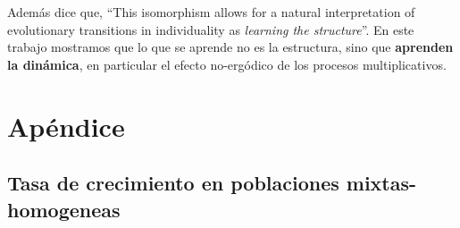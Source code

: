 \documentclass[a4paper,10pt]{article}
\begin{document}
Además \cite{czegel2019-bayesianEvolution} dice que, ``This isomorphism allows for a natural interpretation of evolutionary transitions in individuality as \emph{learning the structure}''.
En este trabajo mostramos que lo que se aprende no es la estructura, sino que \textbf{aprenden la dinámica}, en particular el efecto no-ergódico de los procesos multiplicativos.



% 
{\footnotesize


}

\section{Apéndice}

\subsection{Tasa de crecimiento en poblaciones mixtas-homogeneas}
\end{document}
